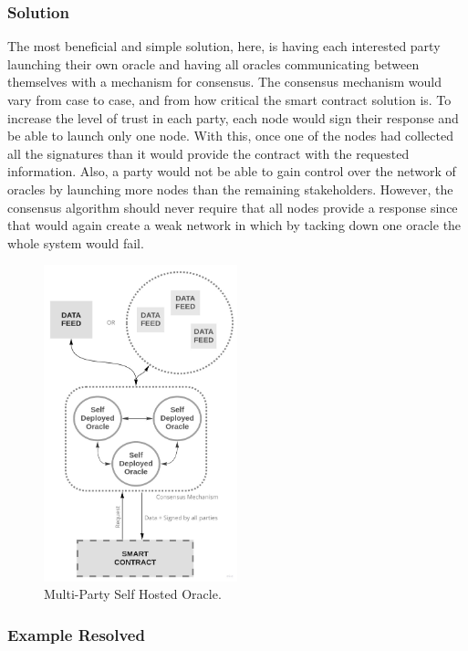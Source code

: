 \subsubsection{Solution}
The most beneficial and simple solution, here, is having each interested party launching their own oracle and having all oracles communicating between themselves with a mechanism for consensus. The consensus mechanism would vary from case to case, and from how critical the smart contract solution is.
To increase the level of trust in each party, each node would sign their response and be able to launch only one node. With this, once one of the nodes had collected all the signatures than it would provide the contract with the requested information. Also, a party would not be able to gain control over the network of oracles by launching more nodes than the remaining stakeholders.
However, the consensus algorithm should never require that all nodes provide a response since that would again create a weak network in which by tacking down one oracle the whole system would fail.


\begin{figure}[t]
  \begin{center}
    \leavevmode
    \includegraphics[width=0.5\textwidth]{figures/oraclearch4.jpg}
    \caption{Multi-Party Self Hosted Oracle.}
    \label{fig:/figures/paper-screening}
  \end{center}
\end{figure}

\subsubsection{Example Resolved}
